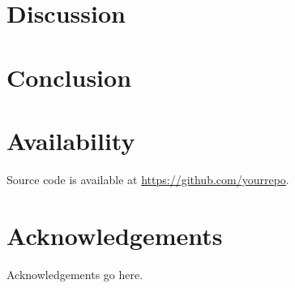 \documentclass[10pt,twocolumn]{article}
\begin{document}
\section{Discussion}

\lipsum[5]

\section{Conclusion}

\lipsum[6]

\section*{Availability}

Source code is available at \url{https://github.com/yourrepo}.

\section*{Acknowledgements}

Acknowledgements go here.


\end{document}
